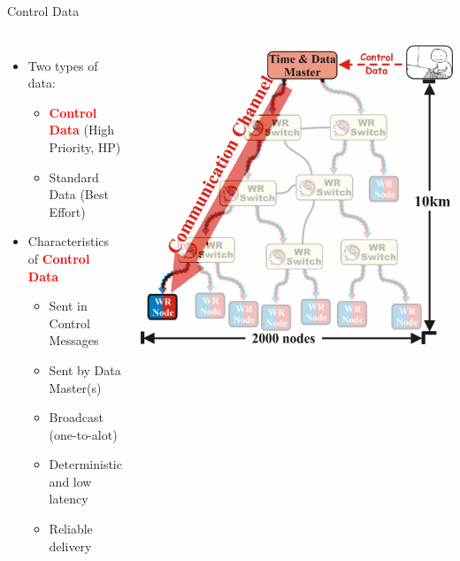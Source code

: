 \documentclass[compress,red]{beamer}
\begin{document}
\begin{frame}{Control Data}

\begin{columns}[c]
    \begin{itemize}
      \item Two types of data:
	  \begin{itemize}
	    \item \textcolor{red}{\bf Control Data} (High Priority, HP)
	    \item Standard Data (Best Effort)
	  \end{itemize}
	  \item Characteristics of \textcolor{red}{\bf Control Data}
	  \begin{itemize}
	    \item Sent in Control Messages
	    \item Sent by Data Master(s)
	    \item Broadcast (one-to-alot)
	    \item Deterministic and low latency
	    \item Reliable delivery
	  \end{itemize}
    \end{itemize}
    \begin{center}
    \includegraphics[height=0.6\textheight]{robustness/CommunicationChannel.pdf}
    \end{center}

\end{columns}

\end{frame}
\end{document}

